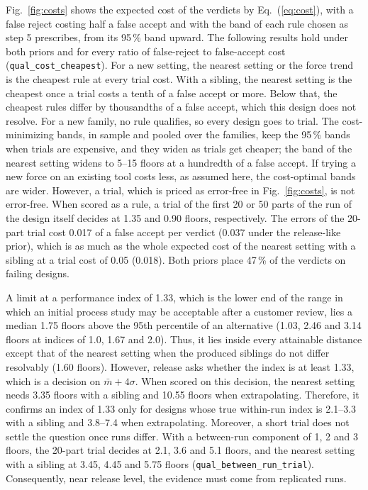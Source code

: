 \documentclass[pdflatex,sn-basic,lineno]{sn-jnl}
\newcommand{\res}[1]{\texttt{#1}}  %
\begin{document}
Fig.~\ref{fig:costs} shows the expected cost of the verdicts by Eq.~(\ref{eq:cost}), with a false reject costing half a false accept and with the band of each rule chosen as step 5 prescribes, from its 95\,\% band upward. The following results hold under both priors and for every ratio of false-reject to false-accept cost (\res{qual\_cost\_cheapest}). For a new setting, the nearest setting or the force trend is the cheapest rule at every trial cost. With a sibling, the nearest setting is the cheapest once a trial costs a tenth of a false accept or more. Below that, the cheapest rules differ by thousandths of a false accept, which this design does not resolve. For a new family, no rule qualifies, so every design goes to trial. The cost-minimizing bands, in sample and pooled over the families, keep the 95\,\% bands when trials are expensive, and they widen as trials get cheaper; the band of the nearest setting widens to 5--15 floors at a hundredth of a false accept. If trying a new force on an existing tool costs less, as assumed here, the cost-optimal bands are wider. However, a trial, which is priced as error-free in Fig.~\ref{fig:costs}, is not error-free. When scored as a rule, a trial of the first 20 or 50 parts of the run of the design itself decides at 1.35 and 0.90 floors, respectively. The errors of the 20-part trial cost 0.017 of a false accept per verdict (0.037 under the release-like prior), which is as much as the whole expected cost of the nearest setting with a sibling at a trial cost of 0.05 (0.018). Both priors place 47\,\% of the verdicts on failing designs.

A limit at a performance index of 1.33, which is the lower end of the range in which an initial process study may be acceptable after a customer review, lies a median 1.75 floors above the 95th percentile of an alternative (1.03, 2.46 and 3.14 floors at indices of 1.0, 1.67 and 2.0). Thus, it lies inside every attainable distance except that of the nearest setting when the produced siblings do not differ resolvably (1.60 floors). However, release asks whether the index is at least 1.33, which is a decision on $\bar m+4\sigma$. When scored on this decision, the nearest setting needs 3.35 floors with a sibling and 10.55 floors when extrapolating. Therefore, it confirms an index of 1.33 only for designs whose true within-run index is 2.1--3.3 with a sibling and 3.8--7.4 when extrapolating. Moreover, a short trial does not settle the question once runs differ. With a between-run component of 1, 2 and 3 floors, the 20-part trial decides at 2.1, 3.6 and 5.1 floors, and the nearest setting with a sibling at 3.45, 4.45 and 5.75 floors (\res{qual\_between\_run\_trial}). Consequently, near release level, the evidence must come from replicated runs.
\end{document}
